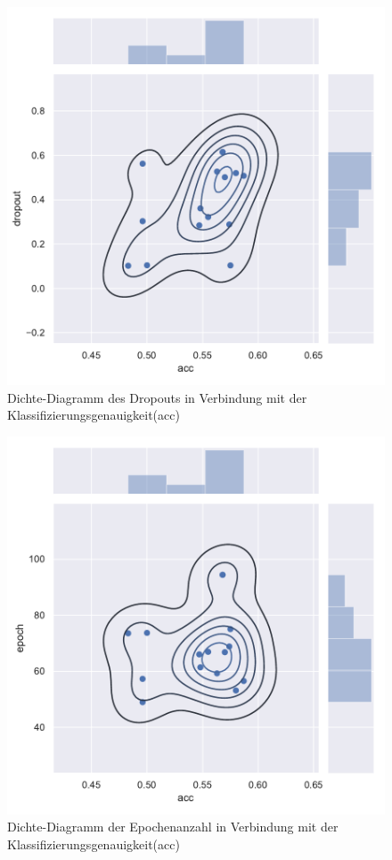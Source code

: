\begin{figure}[H]
  \centering  
  \includegraphics[scale=0.5]{anhang/GA_50_cifar10_True_big_jointplot_dropout.pdf}
  \caption{Dichte-Diagramm des Dropouts in Verbindung mit der Klassifizierungsgenauigkeit(acc)}
  
\end{figure}

\begin{figure}[H]
  \centering  
  \includegraphics[scale=0.5]{anhang/GA_50_cifar10_True_big_jointplot_epoch.pdf}
  \caption{Dichte-Diagramm der Epochenanzahl in Verbindung mit der Klassifizierungsgenauigkeit(acc)}
  
\end{figure}

